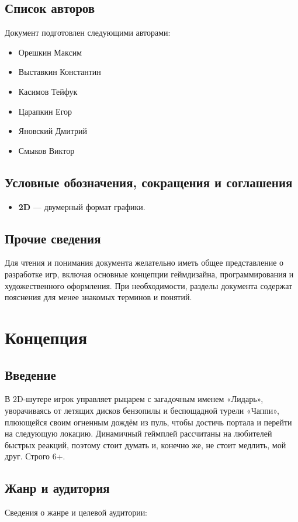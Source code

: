 \documentclass[a4paper,12pt]{article}
\begin{document}
\subsection{Список авторов}
Документ подготовлен следующими авторами:
\begin{itemize}
    \item Орешкин Максим
    \item Выставкин Константин
    \item Касимов Тейфук
    \item Царапкин Егор
    \item Яновский Дмитрий
    \item Смыков Виктор
\end{itemize}

\subsection{Условные обозначения, сокращения и соглашения}
\begin{itemize}
    \item \textbf{2D} — двумерный формат графики.
\end{itemize}

\subsection{Прочие сведения}
Для чтения и понимания документа желательно иметь общее представление о разработке игр, включая основные концепции геймдизайна, программирования и художественного оформления. При необходимости, разделы документа содержат пояснения для менее знакомых терминов и понятий.

\section{Концепция}
\subsection{Введение}
В 2D-шутере игрок управляет рыцарем с загадочным именем «Лидарь», уворачиваясь от летящих дисков бензопилы и беспощадной турели «Чаппи», плюющейся своим огненным дождём из пуль, чтобы достичь портала и перейти на следующую локацию.
Динамичный геймплей рассчитаны на любителей быстрых реакций, поэтому стоит думать и, конечно же, не стоит медлить, мой друг. Строго 6+.

\subsection{Жанр и аудитория}
Сведения о жанре и целевой аудитории:
\end{document}
